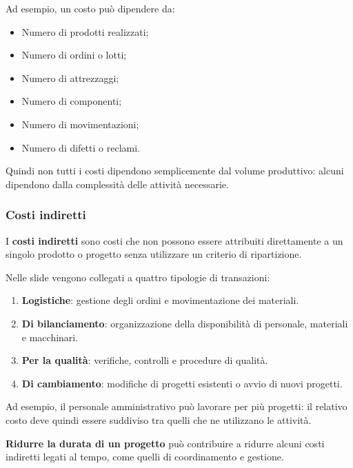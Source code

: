 \medskip

\noindent Ad esempio, un costo può dipendere da:

\begin{itemize}
    \item Numero di prodotti realizzati;
    \item Numero di ordini o lotti;
    \item Numero di attrezzaggi;
    \item Numero di componenti;
    \item Numero di movimentazioni;
    \item Numero di difetti o reclami.
\end{itemize}

\noindent Quindi non tutti i costi dipendono
semplicemente dal volume produttivo:
alcuni dipendono dalla complessità
delle attività necessarie.

\subsubsection*{Costi indiretti}

\noindent I \textbf{costi indiretti} sono costi
che non possono essere attribuiti direttamente
a un singolo prodotto o progetto senza
utilizzare un criterio di ripartizione.

\noindent Nelle slide vengono collegati
a quattro tipologie di transazioni:

\begin{enumerate}
    \item \textbf{Logistiche}: gestione degli ordini
    e movimentazione dei materiali.

    \item \textbf{Di bilanciamento}: organizzazione
    della disponibilità di personale,
    materiali e macchinari.

    \item \textbf{Per la qualità}: verifiche,
    controlli e procedure di qualità.

    \item \textbf{Di cambiamento}: modifiche
    di progetti esistenti o avvio di nuovi progetti.
\end{enumerate}

\noindent Ad esempio, il personale amministrativo
può lavorare per più progetti:
il relativo costo deve quindi essere
suddiviso tra quelli che ne utilizzano le attività.

\medskip

\noindent \textbf{Ridurre la durata di un progetto}
può contribuire a ridurre alcuni costi indiretti
legati al tempo, come quelli di coordinamento
e gestione.

